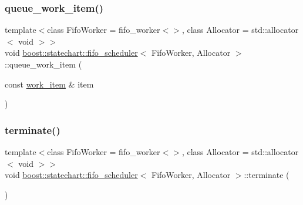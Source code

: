 \subsubsection{\texorpdfstring{queue\+\_\+work\+\_\+item()}{queue\_work\_item()}\hspace{0.1cm}{\footnotesize\ttfamily [2/2]}}
{\footnotesize\ttfamily template$<$class Fifo\+Worker = fifo\+\_\+worker$<$$>$, class Allocator = std\+::allocator$<$ void $>$$>$ \\
void \mbox{\hyperlink{classboost_1_1statechart_1_1fifo__scheduler}{boost\+::statechart\+::fifo\+\_\+scheduler}}$<$ Fifo\+Worker, Allocator $>$\+::queue\+\_\+work\+\_\+item (\begin{DoxyParamCaption}\item[{const \mbox{\hyperlink{classboost_1_1statechart_1_1fifo__scheduler_a72ed2c30a2fa295c2e6909ff09754998}{work\+\_\+item}} \&}]{item }\end{DoxyParamCaption})\hspace{0.3cm}{\ttfamily [inline]}}

\mbox{\label{classboost_1_1statechart_1_1fifo__scheduler_ad8b581c6bc8bee838633b5ed9562b996}} 
\subsubsection{\texorpdfstring{terminate()}{terminate()}}
{\footnotesize\ttfamily template$<$class Fifo\+Worker = fifo\+\_\+worker$<$$>$, class Allocator = std\+::allocator$<$ void $>$$>$ \\
void \mbox{\hyperlink{classboost_1_1statechart_1_1fifo__scheduler}{boost\+::statechart\+::fifo\+\_\+scheduler}}$<$ Fifo\+Worker, Allocator $>$\+::terminate (\begin{DoxyParamCaption}{ }\end{DoxyParamCaption})\hspace{0.3cm}{\ttfamily [inline]}}

